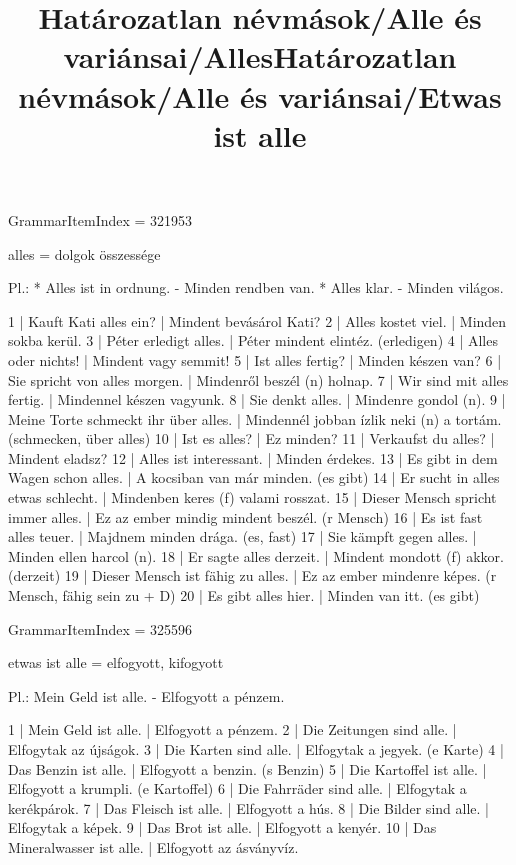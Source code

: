 \title{Határozatlan névmások/Alle és variánsai/Alles}

GrammarItemIndex = 321953

\begin{desc}
alles = dolgok összessége

Pl.: * Alles ist in ordnung. - Minden rendben van.
* Alles klar. - Minden világos.
\end{desc}

\begin{exmp}
1 | Kauft Kati alles ein? | Mindent bevásárol Kati?
2 | Alles kostet viel. | Minden sokba kerül.
3 | Péter erledigt alles. | Péter mindent elintéz. (erledigen)
4 | Alles oder nichts! | Mindent vagy semmit!
5 | Ist alles fertig? | Minden készen van?
6 | Sie spricht von alles morgen. | Mindenről beszél (n) holnap.
7 | Wir sind mit alles fertig. | Mindennel készen vagyunk.
8 | Sie denkt alles. | Mindenre gondol (n).
9 | Meine Torte schmeckt ihr über alles. | Mindennél jobban ízlik neki (n) a tortám. (schmecken, über alles)
10 | Ist es alles? | Ez minden?
11 | Verkaufst du alles? | Mindent eladsz?
12 | Alles ist interessant. | Minden érdekes.
13 | Es gibt in dem Wagen schon alles. | A kocsiban van már minden. (es gibt)
14 | Er sucht in alles etwas schlecht. | Mindenben keres (f) valami rosszat.
15 | Dieser Mensch spricht immer alles. | Ez az ember mindig mindent beszél. (r Mensch)
16 | Es ist fast alles teuer. | Majdnem minden drága. (es, fast)
17 | Sie kämpft gegen alles. | Minden ellen harcol (n).
18 | Er sagte alles derzeit. | Mindent mondott (f) akkor. (derzeit)
19 | Dieser Mensch ist fähig zu alles. | Ez az ember mindenre képes. (r Mensch, fähig sein zu + D)
20 | Es gibt alles hier. | Minden van itt. (es gibt)
\end{exmp}

\title{Határozatlan névmások/Alle és variánsai/Etwas ist alle}

GrammarItemIndex = 325596

\begin{desc}
etwas ist alle = elfogyott, kifogyott

Pl.: Mein Geld ist alle. - Elfogyott a pénzem.
\end{desc}

\begin{exmp}
1 | Mein Geld ist alle. | Elfogyott a pénzem.
2 | Die Zeitungen sind alle. | Elfogytak az újságok.
3 | Die Karten sind alle. | Elfogytak a jegyek. (e Karte)
4 | Das Benzin ist alle. | Elfogyott a benzin. (s Benzin)
5 | Die Kartoffel ist alle. | Elfogyott a krumpli. (e Kartoffel)
6 | Die Fahrräder sind alle. | Elfogytak a kerékpárok.
7 | Das Fleisch ist alle. | Elfogyott a hús.
8 | Die Bilder sind alle. | Elfogytak a képek.
9 | Das Brot ist alle. | Elfogyott a kenyér.
10 | Das Mineralwasser ist alle. | Elfogyott az ásványvíz.
\end{exmp}


